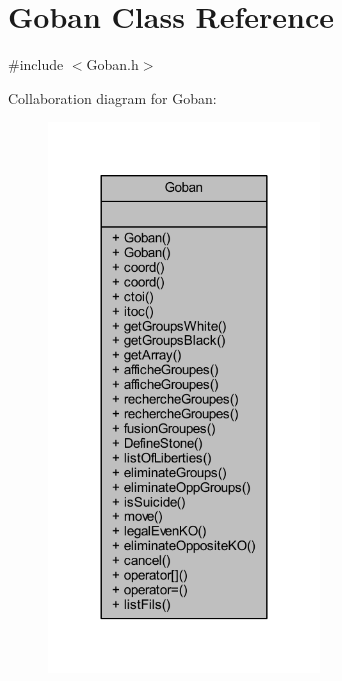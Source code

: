 \hypertarget{class_goban}{}\section{Goban Class Reference}
\label{class_goban}


{\ttfamily \#include $<$Goban.\+h$>$}



Collaboration diagram for Goban\+:\nopagebreak
\begin{figure}[H]
\begin{center}
\leavevmode
\includegraphics[width=204pt]{class_goban__coll__graph}
\end{center}
\end{figure}
